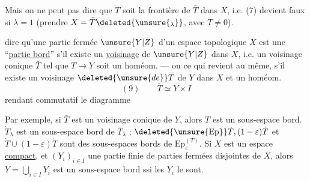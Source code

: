 Mais on ne peut pas dire  que $\dot T$ soit la frontière
de $\bar T$ dans $X$, i.e. (7) devient faux si $\lambda=1$
(prendre $X=\bar T\deleted{\unsure{_\lambda}}$, avec $\dot T\neq0$).

   dire qu'une partie fermée $\unsure{Y|Z}$ d'un
espace topologique $X$ est une ``\uline{partie bord}''
s'il existe un \uline{voisinage} 
 de $\unsure{Y|Z}$ dans $X$,
i.e. un voisinage  conique $\bar T$ tel que
$\dot T\longrightarrow Y$ soit un homéom. --- ou ce qui revient
au même,  s'il existe un
voisinage $\deleted{\unsure{de}}\bar T$ de $Y$ dans $X$ et un homéom.
\[
(9)\qquad\bar T\simeq Y\times I
\]
rendant commutatif le diagramme

Par exemple, si $\bar T$ est un voisinage  conique
 de  $Y$, alors $\dot T$ est un sous-espace bord.
 $\dot T_\lambda$ est un sous-espace bord de $\bar T_\lambda$ ;
$\deleted{\unsure{\mathrm{Ep}}}\dot T,(1-\varepsilon)\dot T$
et $\dot T\cup(1-\varepsilon)\dot T$ sont des sous-espaces
bords de $\mathrm{Ep}_\varepsilon^{(T)}$. 
Si $X$ est un espace
\uline{compact}, et $(Y_i)_{i\in I}$ une partie finie de
parties fermées disjointes de $X$, alors
$Y=\bigcup_{i\in I}Y_i$ est un sous-espace bord ssi les $Y_i$ le sont.
